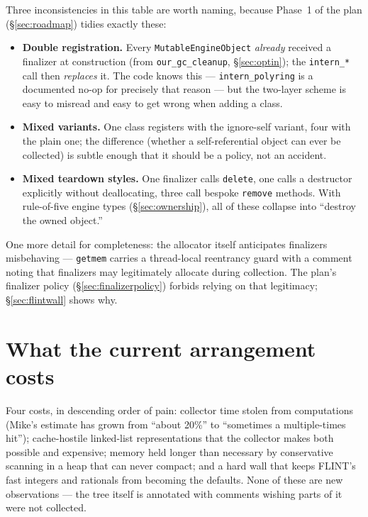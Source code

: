 \documentclass[11pt,oneside]{report}
\newcommand{\code}[1]{\textcolor{m2code}{\texttt{#1}}}
\begin{document}
Three inconsistencies in this table are worth naming, because
Phase~1 of the plan (\S\ref{sec:roadmap}) tidies exactly these:

\begin{itemize}
\item \textbf{Double registration.} Every \code{MutableEngineObject}
  \emph{already} received a finalizer at construction (from
  \code{our\_gc\_cleanup}, \S\ref{sec:optin}); the \code{intern\_*} call
  then \emph{replaces} it. The code knows this --- \code{intern\_polyring}
  is a documented no-op for precisely that reason --- but the two-layer
  scheme is easy to misread and easy to get wrong when adding a class.
\item \textbf{Mixed variants.} One class registers with the ignore-self
  variant, four with the plain one; the difference (whether a
  self-referential object can ever be collected) is subtle enough that it
  should be a policy, not an accident.
\item \textbf{Mixed teardown styles.} One finalizer calls \code{delete},
  one calls a destructor explicitly without deallocating, three call
  bespoke \code{remove} methods. With rule-of-five engine types
  (\S\ref{sec:ownership}), all of these collapse into ``destroy the owned
  object.''
\end{itemize}

One more detail for completeness: the allocator itself anticipates
finalizers misbehaving --- \code{getmem} carries a thread-local reentrancy
guard with a comment noting that finalizers may legitimately allocate
during collection. The plan's finalizer policy (\S\ref{sec:finalizerpolicy})
forbids relying on that legitimacy; \S\ref{sec:flintwall} shows why.

\section{What the current arrangement costs}
\label{sec:costs}

\begin{inbrief}
Four costs, in descending order of pain: collector time stolen from
computations (Mike's estimate has grown from ``about 20\%'' to ``sometimes a
multiple-times hit''); cache-hostile linked-list representations that the
collector makes both possible and expensive; memory held longer than
necessary by conservative scanning in a heap that can never compact; and a
hard wall that keeps FLINT's fast integers and rationals from becoming the
defaults. None of these are new observations --- the tree itself is
annotated with comments wishing parts of it were not collected.
\end{inbrief}
\end{document}
